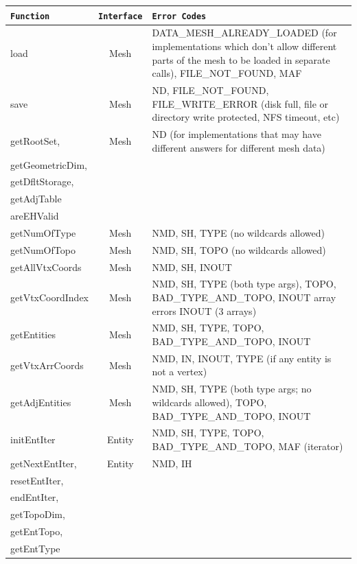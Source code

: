 \documentclass{article}
\begin{document}
\begin{longtable}{|l|c|p{3in}|}
\hline
\textbf{{\tt Function}} & \textbf{{\tt Interface}}& \textbf{{\tt Error Codes}} \\
\hline

load  & Mesh  & DATA\_MESH\_ALREADY\_LOADED (for implementations which don't allow 
different parts of the mesh to be loaded in separate calls), 
FILE\_NOT\_FOUND, MAF \\
\hline

save& Mesh & ND, FILE\_NOT\_FOUND, FILE\_WRITE\_ERROR (disk full, file or directory 
write protected, NFS timeout, etc)\\
\hline

getRootSet, & Mesh& ND (for implementations that may have different answers for 
different mesh data)\\
getGeometricDim, &&\\
getDfltStorage, &&\\
getAdjTable &&\\ 
areEHValid&&\\ 
\hline

getNumOfType& Mesh&NMD, SH, TYPE (no wildcards allowed)\\
\hline

getNumOfTopo& Mesh& NMD, SH, TOPO (no wildcards allowed)\\ 
\hline

getAllVtxCoords& Mesh& NMD, SH, INOUT\\
\hline

getVtxCoordIndex& Mesh& NMD, SH, TYPE (both type args), TOPO, BAD\_TYPE\_AND\_TOPO, INOUT 
array errors INOUT (3 arrays)\\
\hline

getEntities& Mesh & NMD, SH, TYPE, TOPO, BAD\_TYPE\_AND\_TOPO, INOUT \\
\hline

getVtxArrCoords& Mesh& NMD, IN, INOUT, TYPE (if any entity is not a vertex)\\
\hline

getAdjEntities& Mesh & NMD, SH, TYPE (both type args; no wildcards allowed), TOPO, 
BAD\_TYPE\_AND\_TOPO, INOUT\\
\hline

initEntIter& Entity& NMD, SH, TYPE, TOPO, BAD\_TYPE\_AND\_TOPO, MAF (iterator)\\
\hline

getNextEntIter, &Entity&NMD, IH\\
resetEntIter, &&\\
endEntIter, &&\\
getTopoDim, &&\\
getEntTopo, &&\\
getEntType& &\\
\hline


\end{longtable}
\end{document}
